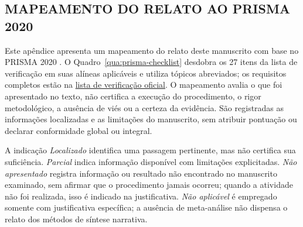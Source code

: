 \begin{apendicesenv}

\chapter{MAPEAMENTO DO RELATO AO PRISMA 2020}
\label{apendice:prisma-checklist}

Este apêndice apresenta um mapeamento do relato deste manuscrito com base no PRISMA 2020 \cite{PRISMA2020}. O Quadro~\ref{qua:prisma-checklist} desdobra os 27 itens da lista de verificação em suas alíneas aplicáveis e utiliza tópicos abreviados; os requisitos completos estão na \href{https://www.prisma-statement.org/prisma-2020-checklist}{lista de verificação oficial}. O mapeamento avalia o que foi apresentado no texto, não certifica a execução do procedimento, o rigor metodológico, a ausência de viés ou a certeza da evidência. São registradas as informações localizadas e as limitações do manuscrito, sem atribuir pontuação ou declarar conformidade global ou integral.

A indicação \textit{Localizado} identifica uma passagem pertinente, mas não certifica sua suficiência. \textit{Parcial} indica informação disponível com limitações explicitadas. \textit{Não apresentado} registra informação ou resultado não encontrado no manuscrito examinado, sem afirmar que o procedimento jamais ocorreu; quando a atividade não foi realizada, isso é indicado na justificativa. \textit{Não aplicável} é empregado somente com justificativa específica; a ausência de meta-análise não dispensa o relato dos métodos de síntese narrativa.

\begingroup
{}


\end{apendicesenv}
